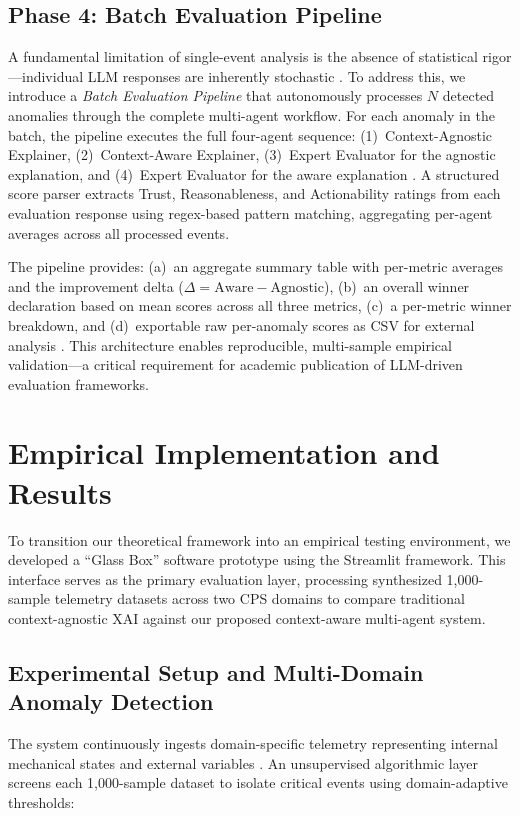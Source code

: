 \documentclass[a4paper,fleqn]{cas-dc}
\begin{document}
\subsection{Phase 4: Batch Evaluation Pipeline}
A fundamental limitation of single-event analysis is the absence of statistical rigor---individual LLM responses are inherently stochastic \cite{ref_llm_judge}. To address this, we introduce a \textit{Batch Evaluation Pipeline} that autonomously processes $N$ detected anomalies through the complete multi-agent workflow. For each anomaly in the batch, the pipeline executes the full four-agent sequence: (1)~Context-Agnostic Explainer, (2)~Context-Aware Explainer, (3)~Expert Evaluator for the agnostic explanation, and (4)~Expert Evaluator for the aware explanation \cite{ref_autogen}. A structured score parser extracts Trust, Reasonableness, and Actionability ratings from each evaluation response using regex-based pattern matching, aggregating per-agent averages across all processed events.

The pipeline provides: (a)~an aggregate summary table with per-metric averages and the improvement delta ($\Delta = \text{Aware} - \text{Agnostic}$), (b)~an overall winner declaration based on mean scores across all three metrics, (c)~a per-metric winner breakdown, and (d)~exportable raw per-anomaly scores as CSV for external analysis \cite{ref_batch_eval}. This architecture enables reproducible, multi-sample empirical validation---a critical requirement for academic publication of LLM-driven evaluation frameworks.

\section{Empirical Implementation and Results}

To transition our theoretical framework into an empirical testing environment, we developed a ``Glass Box'' software prototype using the Streamlit framework. This interface serves as the primary evaluation layer, processing synthesized 1,000-sample telemetry datasets across two CPS domains to compare traditional context-agnostic XAI against our proposed context-aware multi-agent system.

\subsection{Experimental Setup and Multi-Domain Anomaly Detection}
The system continuously ingests domain-specific telemetry representing internal mechanical states and external variables \cite{ref3}. An unsupervised algorithmic layer screens each 1,000-sample dataset to isolate critical events using domain-adaptive thresholds:
\end{document}
